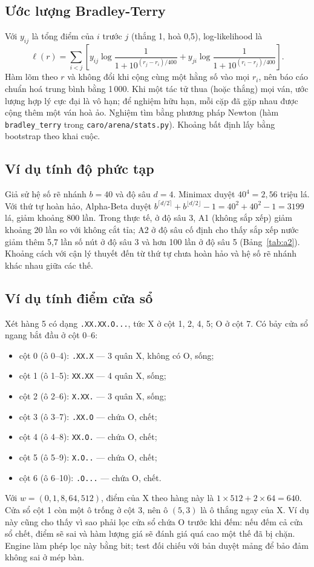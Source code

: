 \subsection{Ước lượng Bradley-Terry}
\label{sec:lt-bt-uoc-luong}
Với $y_{ij}$ là tổng điểm của $i$ trước $j$ (thắng 1, hoà 0,5), log-likelihood là
\begin{equation}
  \ell(r)=\sum_{i<j}\left[y_{ij}\log\frac{1}{1+10^{(r_j-r_i)/400}}+
  y_{ji}\log\frac{1}{1+10^{(r_i-r_j)/400}}\right].
  \label{eq:bt-ll}
\end{equation}
Hàm lõm theo $r$ và không đổi khi cộng cùng một hằng số vào mọi $r_i$, nên báo cáo chuẩn hoá trung
bình bằng 1\,000. Khi một tác tử thua (hoặc thắng) mọi ván, ước lượng hợp lý cực đại là vô hạn; để
nghiệm hữu hạn, mỗi cặp đã gặp nhau được cộng thêm một ván hoà ảo. Nghiệm tìm bằng phương pháp
Newton (hàm \texttt{bradley\_terry} trong \texttt{caro/arena/stats.py}). Khoảng bất định lấy bằng
bootstrap theo khai cuộc.

\subsection{Ví dụ tính độ phức tạp}
Giả sử hệ số rẽ nhánh $b=40$ và độ sâu $d=4$. Minimax duyệt $40^4=2{,}56$ triệu lá. Với thứ tự
hoàn hảo, Alpha-Beta duyệt $b^{\lceil d/2\rceil}+b^{\lfloor d/2\rfloor}-1=40^2+40^2-1=\num{3199}$
lá, giảm khoảng 800 lần. Trong thực tế, ở độ sâu 3, A1 (không sắp xếp) giảm khoảng 20 lần so với
không cắt tỉa; A2 ở độ sâu cố định cho thấy sắp xếp nước giảm thêm 5,7 lần số nút ở độ sâu 3 và
hơn 100 lần ở độ sâu 5 (Bảng~\ref{tab:a2}). Khoảng cách với cận lý thuyết đến từ thứ tự chưa hoàn
hảo và hệ số rẽ nhánh khác nhau giữa các thế.

\subsection{Ví dụ tính điểm cửa sổ}
Xét hàng 5 có dạng \texttt{.XX.XX.O...}, tức X ở cột 1, 2, 4, 5; O ở cột 7. Có bảy cửa sổ
ngang bắt đầu ở cột 0--6:
\begin{itemize}
  \item cột 0 (ô 0--4): \texttt{.XX.X} — 3 quân X, không có O, sống;
  \item cột 1 (ô 1--5): \texttt{XX.XX} — 4 quân X, sống;
  \item cột 2 (ô 2--6): \texttt{X.XX.} — 3 quân X, sống;
  \item cột 3 (ô 3--7): \texttt{.XX.O} — chứa O, chết;
  \item cột 4 (ô 4--8): \texttt{XX.O.} — chứa O, chết;
  \item cột 5 (ô 5--9): \texttt{X.O..} — chứa O, chết;
  \item cột 6 (ô 6--10): \texttt{.O...} — chứa O, chết.
\end{itemize}
Với $w=(0,1,8,64,512)$, điểm của X theo hàng này là $1 \times 512 + 2 \times 64 = 640$. Cửa sổ
cột 1 còn một ô trống ở cột 3, nên ô $(5,3)$ là ô thắng ngay của X. Ví dụ này cũng cho thấy vì
sao phải lọc cửa sổ chứa O trước khi đếm: nếu đếm cả cửa sổ chết, điểm sẽ sai và hàm lượng giá
sẽ đánh giá quá cao một thế đã bị chặn. Engine làm phép lọc này bằng bit; test đối chiếu với
bản duyệt mảng để bảo đảm không sai ở mép bàn.

\ifdefined\ChuyenSau\fi
